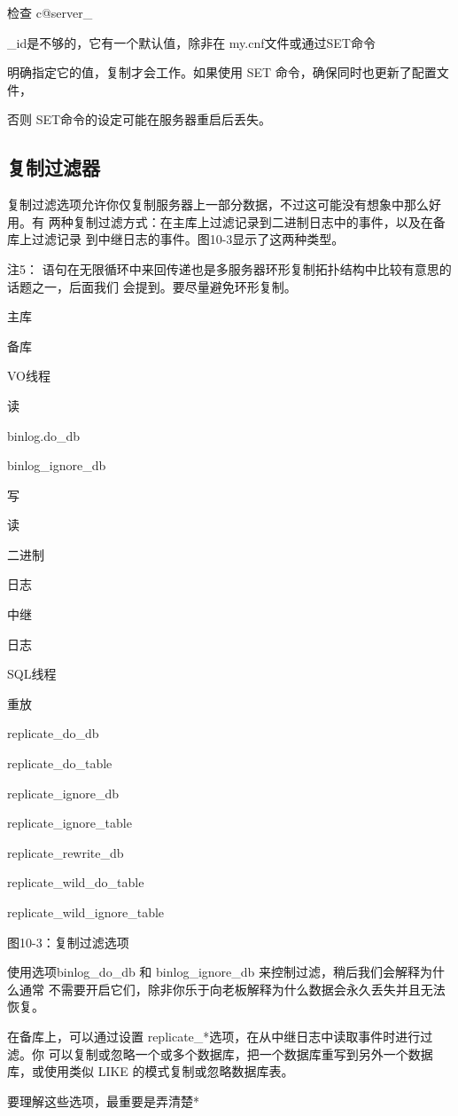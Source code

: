 检查 c@server\_

\_id是不够的，它有一个默认值，除非在 my.cnf文件或通过SET命令

明确指定它的值，复制才会工作。如果使用 SET 命令，确保同时也更新了配置文件，

否则 SET命令的设定可能在服务器重启后丢失。

\subsection{复制过滤器}
复制过滤选项允许你仅复制服务器上一部分数据，不过这可能没有想象中那么好用。有
两种复制过滤方式：在主库上过滤记录到二进制日志中的事件，以及在备库上过滤记录
到中继日志的事件。图10-3显示了这两种类型。

注5： 语句在无限循环中来回传递也是多服务器环形复制拓扑结构中比较有意思的话题之一，后面我们
会提到。要尽量避免环形复制。

主库

备库

VO线程

读

binlog.do\_db

binlog\_ignore\_db

写

读

二进制

日志

中继

日志

SQL线程

重放

replicate\_do\_db

replicate\_do\_table

replicate\_ignore\_db

replicate\_ignore\_table

replicate\_rewrite\_db

replicate\_wild\_do\_table

replicate\_wild\_ignore\_table

图10-3：复制过滤选项

使用选项binlog\_do\_db 和 binlog\_ignore\_db 来控制过滤，稍后我们会解释为什么通常
不需要开启它们，除非你乐于向老板解释为什么数据会永久丢失并且无法恢复。

在备库上，可以通过设置 replicate\_*选项，在从中继日志中读取事件时进行过滤。你
可以复制或忽略一个或多个数据库，把一个数据库重写到另外一个数据库，或使用类似
LIKE 的模式复制或忽略数据库表。

要理解这些选项，最重要是弄清楚*

